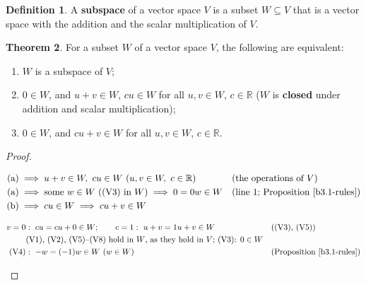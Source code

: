 \documentclass[12pt]{article}
\newcommand{\R}{\mathbb R}
\theoremstyle{definition}
\newtheorem{theorem}{Theorem}
\newtheorem{definition}[theorem]{Definition}
\newcommand{\boardtop}{\vspace*{-\abovedisplayskip}}
\begin{document}
\begin{definition}\label{b3.3}
A \textbf{subspace} of a vector space \(V\) is a subset \(W\subseteq V\) that is a vector space with the addition and
the scalar multiplication of \(V\).
\end{definition}

\begin{theorem}\label{b3.4}
For a subset \(W\) of a vector space \(V\), the following are equivalent:
\begin{enumerate}
\item \(W\) is a subspace of \(V\);
\item \(0\in W\), and \(u+v\in W\), \(cu\in W\) for all \(u,v\in W\), \(c\in\R\) (\(W\) is \textbf{closed} under
addition and scalar multiplication);
\item \(0\in W\), and \(cu+v\in W\) for all \(u,v\in W\), \(c\in\R\).
\end{enumerate}
\end{theorem}
\begin{proof}
\begin{board}
\boardtop
\begin{align*}
\text{(a)}&\implies u+v\in W,\ cu\in W\ (u,v\in W,\ c\in\R)&&\text{(the operations of \(V\))}\\
\text{(a)}&\implies\text{some }w\in W\ \text{((V3) in \(W\))}\implies0=0w\in W&&\text{(line 1; Proposition~\ref{b3.1-rules})}\\
\text{(b)}&\implies cu\in W\implies cu+v\in W
\end{align*}
\end{board}
\begin{board}
\boardtop
\begin{align*}
v=0&:\ cu=cu+0\in W;\qquad c=1:\ u+v=1u+v\in W&&\text{((V3), (V5))}\\
&\text{(V1), (V2), (V5)--(V8) hold in \(W\), as they hold in \(V\); (V3): \(0\in W\)}\\
\text{(V4)}&:\ -w=(-1)w\in W\ (w\in W)&&\text{(Proposition~\ref{b3.1-rules})}
\end{align*}
\end{board}
\nopagebreak
\end{proof}
\end{document}
